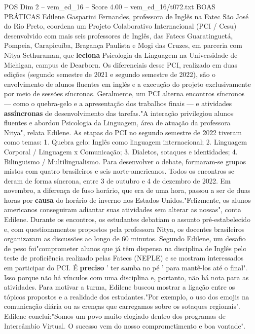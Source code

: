 \begin{textsample}{POS Dim 2 – vem\_ed\_16 – Score 4.00 – vem\_ed\_16/t072.txt}  \label{ex:f2_pos_088}
BOAS PRÁTICAS Edilene Gasparini Fernandes, professora de Inglês na Fatec São José do Rio Preto, coordena um Projeto Colaborativo Internacional (PCI / Cesu) desenvolvido com mais seis professores de Inglês, das Fatecs Guaratinguetá, Pompeia, Carapicuíba, Bragança Paulista e Mogi das Cruzes, em parceria com Nitya Sethuraman, que \textbf{leciona} Psicologia da Linguagem na Universidade de Michigan, campus de Dearborn.
Os diferenciais desse PCI, realizado em duas edições (segundo semestre de 2021 e segundo semestre de 2022), são o envolvimento de alunos fluentes em inglês e a execução do projeto exclusivamente por meio de sessões síncronas.
Geralmente, um PCI alterna encontros síncronos — como o quebra-gelo e a apresentação dos trabalhos finais — e atividades \textbf{assíncronas} de desenvolvimento das tarefas."A interação privilegiou alunos fluentes e abordou Psicologia da Linguagem, área de atuação da professora Nitya", relata Edilene.
As etapas do PCI no segundo semestre de 2022 tiveram como temas: 1.
Quebra gelo: Inglês como linguagem internacional; 2.
Linguagem Corporal / Linguagem x Comunicação; 3.
Dialetos, sotaques e identidades; 4.
Bilinguismo / Multilingualismo.
Para desenvolver o debate, formaram-se grupos mistos com quatro brasileiros e seis norte-americanos.
Todos os encontros se deram de forma síncrona, entre 3 de outubro e 4 de dezembro de 2022.
Em novembro, a diferença de fuso horário, que era de uma hora, passou a ser de duas horas por \textbf{causa} do horário de inverno nos Estados Unidos."Felizmente, os alunos americanos conseguiram adiantar suas atividades sem alterar as nossas", conta Edilene.
Durante os encontros, os estudantes debatiam o assunto pré-estabelecido e, com questionamentos propostos pela professora Nitya, os docentes brasileiros organizavam as discussões ao longo de 60 minutos.
Segundo Edilene, um desafio de peso foi"comprometer alunos que já têm dispensa na disciplina de Inglês pelo teste de proficiência realizado pelas Fatecs (NEPLE) e se mostram interessados em participar do PCI.
É \textbf{preciso} ' ter samba no pé ' para mantê-los até o final".
Isso porque não há vínculos com uma disciplina e, portanto, não há nota para as atividades.
Para motivar a turma, Edilene buscou mostrar a ligação entre os tópicos propostos e a realidade dos estudantes."Por exemplo, o uso dos emojis na comunicação diária ou as crenças que carregamos sobre os sotaques regionais".
Edilene conclui:"Somos um povo muito elogiado dentro dos programas de Intercâmbio Virtual.
O sucesso vem do nosso comprometimento e boa vontade".

\end{textsample}
